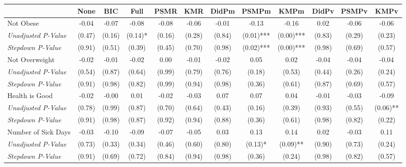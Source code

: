 \begin{tabular}{l c c c c c c c c c c c}
\toprule
 & None & BIC & Full & PSMR & KMR & DidPm & PSMPm & KMPm & DidPv & PSMPv & KMPv \\
\midrule
Not Obese & -0.04 & -0.07 & -0.08 & -0.08 & -0.06 & -0.01 & -0.13 & -0.16 & 0.02 & -0.06 & -0.06 \\
\quad \textit{Unadjusted P-Value} & (0.47) & (0.16) & (0.14)* & (0.16) & (0.28) & (0.84) & (0.01)*** & (0.00)*** & (0.83) & (0.29) & (0.23) \\
\quad \textit{Stepdown P-Value} & (0.91) & (0.51) & (0.39) & (0.45) & (0.70) & (0.98) & (0.02)*** & (0.00)*** & (0.98) & (0.69) & (0.57) \\
Not Overweight & -0.02 & -0.01 & -0.02 & 0.00 & -0.01 & -0.02 & 0.05 & 0.02 & -0.04 & -0.04 & -0.04 \\
\quad \textit{Unadjusted P-Value} & (0.54) & (0.87) & (0.64) & (0.99) & (0.79) & (0.76) & (0.18) & (0.53) & (0.44) & (0.26) & (0.24) \\
\quad \textit{Stepdown P-Value} & (0.91) & (0.98) & (0.82) & (0.99) & (0.94) & (0.98) & (0.36) & (0.61) & (0.87) & (0.69) & (0.57) \\
Health is Good & -0.02 & -0.00 & 0.01 & -0.02 & -0.03 & 0.07 & 0.07 & 0.04 & -0.01 & -0.03 & -0.09 \\
\quad \textit{Unadjusted P-Value} & (0.78) & (0.99) & (0.87) & (0.70) & (0.64) & (0.43) & (0.16) & (0.39) & (0.93) & (0.55) & (0.06)** \\
\quad \textit{Stepdown P-Value} & (0.91) & (0.98) & (0.87) & (0.92) & (0.94) & (0.88) & (0.36) & (0.61) & (0.98) & (0.82) & (0.22) \\
Number of Sick Days & -0.03 & -0.10 & -0.09 & -0.07 & -0.05 & 0.03 & 0.13 & 0.14 & 0.02 & -0.03 & 0.11 \\
\quad \textit{Unadjusted P-Value} & (0.73) & (0.33) & (0.34) & (0.46) & (0.60) & (0.80) & (0.13)* & (0.09)** & (0.90) & (0.73) & (0.24) \\
\quad \textit{Stepdown P-Value} & (0.91) & (0.69) & (0.72) & (0.84) & (0.94) & (0.98) & (0.36) & (0.24) & (0.98) & (0.82) & (0.57) \\
\bottomrule
\end{tabular}
